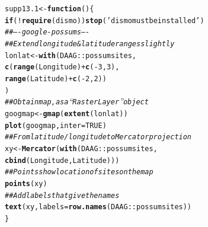 \documentclass[12pt, a4paper,  BCOR=8.25mm, DIV=15]{scrartcl}\usepackage[]{graphicx}\usepackage[]{color}
\makeatletter
\newcommand{\hlnum}[1]{\textcolor[rgb]{0.686,0.059,0.569}{#1}}%
\newcommand{\hlstr}[1]{\textcolor[rgb]{0.192,0.494,0.8}{#1}}%
\newcommand{\hlcom}[1]{\textcolor[rgb]{0.678,0.584,0.686}{\textit{#1}}}%
\newcommand{\hlopt}[1]{\textcolor[rgb]{0,0,0}{#1}}%
\newcommand{\hlstd}[1]{\textcolor[rgb]{0.345,0.345,0.345}{#1}}%
\newcommand{\hlkwa}[1]{\textcolor[rgb]{0.161,0.373,0.58}{\textbf{#1}}}%
\newcommand{\hlkwb}[1]{\textcolor[rgb]{0.69,0.353,0.396}{#1}}%
\newcommand{\hlkwc}[1]{\textcolor[rgb]{0.333,0.667,0.333}{#1}}%
\newcommand{\hlkwd}[1]{\textcolor[rgb]{0.737,0.353,0.396}{\textbf{#1}}}%
\newenvironment{kframe}{%
 \def\at@end@of@kframe{}%
 \ifinner\ifhmode%
  \def\at@end@of@kframe{\end{minipage}}%
  \begin{minipage}{\columnwidth}%
 \fi\fi%
 \def\FrameCommand##1{\hskip\@totalleftmargin \hskip-\fboxsep
 \colorbox{shadecolor}{##1}\hskip-\fboxsep
     \hskip-\linewidth \hskip-\@totalleftmargin \hskip\columnwidth}%
 \MakeFramed {\advance\hsize-\width
   \@totalleftmargin\z@ \linewidth\hsize
   \@setminipage}}%
 {\par\unskip\endMakeFramed%
 \at@end@of@kframe}
\newenvironment{knitrout}{}{} %
\makeatother
\begin{document}
\begin{knitrout}
\color{fgcolor}\begin{kframe}
\begin{alltt}
\hlstd{supp13.1} \hlkwb{<-} \hlkwa{function}\hlstd{()\{}
\hlkwa{if}\hlstd{(}\hlopt{!}\hlkwd{require}\hlstd{(dismo))}\hlkwd{stop}\hlstd{(}\hlstr{'dismo must be installed'}\hlstd{)}
\hlcom{## ---- google-possums ----}
\hlcom{## Extend longitude & latitude ranges slightly}
\hlstd{lonlat} \hlkwb{<-} \hlkwd{with}\hlstd{(DAAG}\hlopt{::}\hlstd{possumsites,}
               \hlkwd{c}\hlstd{(}\hlkwd{range}\hlstd{(Longitude)}\hlopt{+}\hlkwd{c}\hlstd{(}\hlopt{-}\hlnum{3}\hlstd{,}\hlnum{3}\hlstd{),}
                 \hlkwd{range}\hlstd{(Latitude)}\hlopt{+}\hlkwd{c}\hlstd{(}\hlopt{-}\hlnum{2}\hlstd{,}\hlnum{2}\hlstd{))}
\hlstd{)}
\hlcom{## Obtain map, as a ``RasterLayer'' object}
\hlstd{googmap} \hlkwb{<-} \hlkwd{gmap}\hlstd{(}\hlkwd{extent}\hlstd{(lonlat))}
\hlkwd{plot}\hlstd{(googmap,} \hlkwc{inter}\hlstd{=}\hlnum{TRUE}\hlstd{)}
\hlcom{## From latitude/longitude to Mercator projection}
\hlstd{xy} \hlkwb{<-} \hlkwd{Mercator}\hlstd{(}\hlkwd{with}\hlstd{(DAAG}\hlopt{::}\hlstd{possumsites,}
                    \hlkwd{cbind}\hlstd{(Longitude, Latitude)))}
\hlcom{## Points show location of sites on the map}
\hlkwd{points}\hlstd{(xy)}
\hlcom{## Add labels that give the names}
\hlkwd{text}\hlstd{(xy,} \hlkwc{labels}\hlstd{=}\hlkwd{row.names}\hlstd{(DAAG}\hlopt{::}\hlstd{possumsites))}
\hlstd{\}}
\end{alltt}
\end{kframe}
\end{knitrout}
\end{document}
